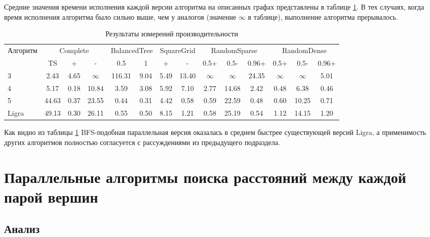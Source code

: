 \FloatBarrier
Средние значения времени исполнения каждой версии алгоритма на описанных графах представлены в таблице \ref{graph_description}. В тех случаях, когда время исполнения алгоритма было сильно выше, чем у аналогов (значение $\infty$ в таблице), выполнение алгоритма прерывалось.
\begin{table}[H]
\centering
\caption{Результаты измерений производительности}
\begin{tabular}{l|ccc|cc|cc|ccc|ccc}  
\hline
Алгоритм & \multicolumn{3}{c}{Complete} & \multicolumn{2}{c}{BalancedTree} & \multicolumn{2}{c}{SquareGrid} & \multicolumn{3}{c}{RandomSparse} & \multicolumn{3}{c}{RandomDense}\\
& TS & + & - & 0.5 & 1 & + & - & 0.5+  & 0.5- & 0.96+ & 0.5+ & 0.5- & 0.96+\\
\hline\hline
3 & 2.43 & 4.65 & $\infty$ & 116.31 & 9.04 & 5.49 & 13.40 & $\infty$ & $\infty$ & 24.35 & $\infty$ & $\infty$ & 5.01 \\  
4 & 5.17 & 0.18 & 10.84 & 3.59 & 3.08 & 5.92 & 7.10 & 2.77 & 14.68 & 2.42 & 0.48  & 6.38  & 0.46 \\
5 & 44.63 & 0.37 & 23.55 & 0.44 & 0.31 & 4.42 & 0.58 & 0.59 & 22.59 & 0.48  & 0.60  & 10.25 & 0.71 \\
Ligra & 49.13 & 0.30 & 26.11 & 0.55 & 0.50 & 8.15 & 1.21 & 0.58 & 25.19 & 0.54  & 1.12  & 14.15 & 1.20 \\
\hline
\end{tabular}

\label{graph_description}
\end{table}

Как видно из таблицы \ref{graph_description} BFS-подобная параллельная версия оказалась в среднем быстрее существующей версий Ligra, а применимость других алгоритмов полностью согласуется с рассуждениями из предыдущего подраздела.  

\FloatBarrier
\section{Параллельные алгоритмы поиска расстояний между каждой парой вершин}

\FloatBarrier
\subsection{Анализ}


